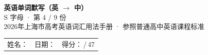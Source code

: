 \documentclass[10pt,a4paper]{article}
\begin{document}
\pagestyle{plain}

\begin{center}
{\LARGE\bfseries 英语单词默写（英 $\to$ 中）}\\[0.22em]
{\large S 字母 · 第 4 / 9 份}\\[0.18em]
{\small 2026年上海市高考英语词汇用法手册 · 参照普通高中英语课程标准}
\end{center}

\vspace{0.25em}
\noindent\begin{tabular}{@{}p{}@{}p{}@{}p{}@{}}
姓名：\underline{\hspace{2.0cm}} & 日期：\underline{\hspace{2.0cm}} & 得分：\underline{\hspace{1.3cm}}\,/\,47 \\
\end{tabular}

\vspace{0.3em}

\vspace{0.08em}
\end{document}
